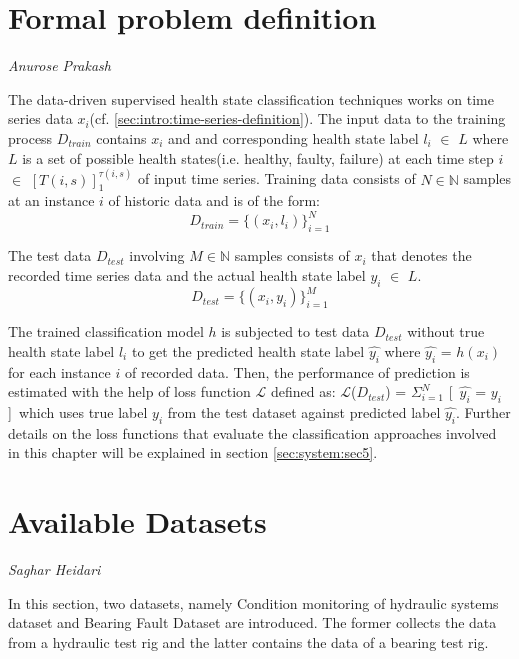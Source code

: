 \section{Formal problem definition}
\vspace*{-15mm}
\hfill{\normalsize\emph{Anurose Prakash}}
\label{sec:system:sec2}

The data-driven supervised health state classification techniques works on time series data $x_i$(cf. \ref{sec:intro:time-series-definition}). The input data to the training process $D_{train}$ contains $x_i$ and and corresponding health state label $l_i$ $\in$ $L$ where $L$ is a set of possible health states(i.e. healthy, faulty, failure) at each time step $i$ $\in$ $[T(i,s)]_1^{\tau(i,s)}$ of input time series. Training data consists of $N \in \mathbb{N}$  samples at an instance $i$ of historic data and is of the form:
\begin{equation}
  D_{train} = \{(x_i,l_i)\}_{i=1}^N  
\end{equation}


The test data $D_{test}$ involving $M \in \mathbb{N}$ samples consists of $x_i$ that denotes the recorded time series data and the actual health state label $y_i$ $\in$ $L$. 
\begin{equation}
  D_{test} = \{(x_i,y_i)\}_{i=1}^M  
\end{equation}

The trained classification model $h$ is subjected to test data $D_{test}$ without true health state label $l_i$ to get the predicted health state label $\hat{y_i}$ where $\hat{y_i}$ = $h(x_i)$ for each instance $i$ of recorded data. Then, the performance of prediction is estimated with the help of loss function $\mathcal{L}$ defined as:
$\mathcal{L}$($D_{test}$) = $\Sigma_{i=1}^N$ [\, $\hat{y_i}$ = $y_i$ ]\,
which uses true label $y_i$ from the test dataset against predicted label $\hat{y_i}$. Further details on the loss functions that evaluate the classification approaches involved in this chapter will be explained in section \ref{sec:system:sec5}.


\section{Available Datasets}
\vspace*{-15mm}
\hfill{\normalsize\emph{Saghar Heidari}}
\label{sec:HS:datasets}

In this section, two datasets, namely Condition monitoring of hydraulic systems dataset and Bearing Fault Dataset are introduced. The former collects the data from a hydraulic test rig and the latter contains the data of a bearing test rig.
